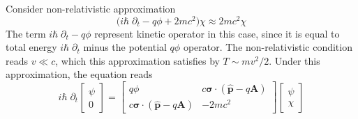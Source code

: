\documentclass[../../../main.tex]{subfiles}
\begin{document}
Consider non-relativistic approximation
\begin{equation*}
    \bigl(i\hbar \; \partial_t - q\phi + 2mc^{2}\bigr)\chi \approx 2mc^{2}\chi
\end{equation*}
The term $i\hbar \; \partial_t - q\phi$ represent kinetic operator in this case, since it is equal to total energy $i\hbar \; \partial_t$ minus the potential $q\phi$ operator.
The non-relativistic condition reads $v \ll c$, which this approximation satisfies by $T \sim mv^2/2$.
Under this approximation, the equation reads
\begin{equation*}
    i\hbar \; \partial_t
    \begin{bmatrix}
        \psi \\
        0
    \end{bmatrix}
    =
    \begin{bmatrix}
        q\phi                                                  & c\boldsymbol{\sigma}\cdot(\hat{\mathbf p}-q\mathbf{A}) \\
        c\boldsymbol{\sigma}\cdot(\hat{\mathbf p}-q\mathbf{A}) & -2mc^2
    \end{bmatrix}
    \begin{bmatrix}
        \psi \\
        \chi
    \end{bmatrix}
\end{equation*}
\end{document}
